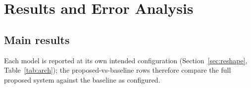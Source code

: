 \documentclass[11pt]{article}
\begin{document}
\section{Results and Error Analysis}

\subsection{Main results}

Each model is reported at its own intended configuration (Section~\ref{sec:reshape}, Table~\ref{tab:arch}); the proposed-vs-baseline rows therefore compare the full proposed system against the baseline as configured.

\begin{table}[!t]
  \centering
  \small
  \caption{Results on ViHSD (test). Best per column in bold (accuracy shown for reference).}
  \label{tab:vihsd}
\end{table}
\end{document}
